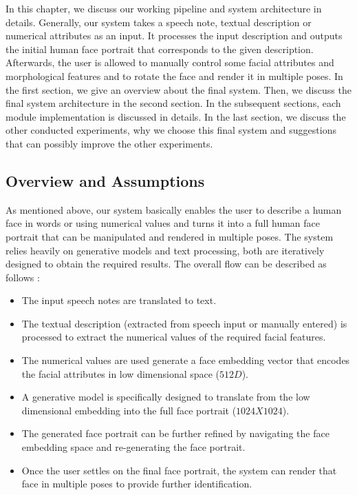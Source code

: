 In this chapter, we discuss our working pipeline and system architecture in details.  Generally, our system takes a speech note, textual description or numerical attributes as an input. It processes the input description and outputs the initial human face portrait that corresponds to the given description. Afterwards, the user is allowed to manually control some facial attributes and morphological features and to rotate the face and render it in multiple poses. In the first section, we give an overview about the final system. Then, we discuss the final system architecture in the second section. In the subsequent sections, each module implementation is discussed in details. In the last section, we discuss the other conducted experiments, why we choose this final system and suggestions that can possibly improve the other experiments.

\subsection{Overview and Assumptions}

As mentioned above, our system basically enables the user to describe a human face in words or using numerical values and turns it into a full human face portrait that can be manipulated and rendered in multiple poses. The system relies heavily on generative models and text processing, both are iteratively designed to obtain the required results. The overall flow can be described as follows :
\begin{itemize}
    \item The input speech notes are translated to text.
    \item The textual description (extracted from speech input or manually entered) is processed to extract the numerical values of the required facial features.
    \item The numerical values are used generate a face embedding vector that encodes the facial attributes in low dimensional space ($512D$).
    \item A generative model is specifically designed to translate from the low dimensional embedding into the full face portrait ($1024X1024$).
    \item The generated face portrait can be further refined by navigating the face embedding space and re-generating the face portrait.
    \item Once the user settles on the final face portrait, the system can render that face in multiple poses to provide further identification.
\end{itemize}

